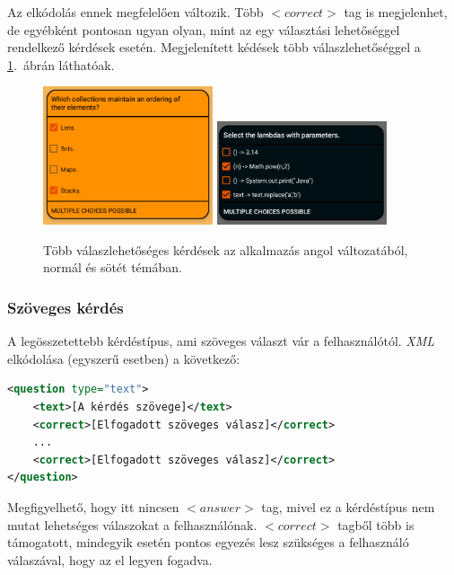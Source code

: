 \documentclass[12pt,a4paper]{article}
\newcommand{\xml}{\textit{XML}\xspace}
\begin{document}
	Az elkódolás ennek megfelelően változik. Több $<correct>$ tag is megjelenhet, de egyébként pontosan ugyan olyan, mint az egy választási lehetőséggel rendelkező kérdések esetén. Megjelenített kédések több válaszlehetőséggel a \ref{question_multi_choice_figure}.\ ábrán láthatóak.
	
	\begin{figure}[h!]
		\centering
		\includegraphics[width=5cm]{question_multi_choice}
		\includegraphics[width=5cm]{question_multi_choice_dark}
		\caption{Több válaszlehetőséges kérdések az alkalmazás angol változatából, normál és sötét témában.}
		\label{question_multi_choice_figure}
	\end{figure}
	
	\subsubsection{Szöveges kérdés}\label{question_text}
	
	A legösszetettebb kérdéstípus, ami szöveges választ vár a felhasználótól. \xml elkódolása (egyszerű esetben) a következő:
	
	\bigskip
	\begin{lstlisting}[language=XML]
<question type="text">
	<text>[A kérdés szövege]</text>
	<correct>[Elfogadott szöveges válasz]</correct>
	...
	<correct>[Elfogadott szöveges válasz]</correct>
</question>
	\end{lstlisting}
	\bigskip
	
	\noindent
	Megfigyelhető, hogy itt nincsen $<answer>$ tag, mivel ez a kérdéstípus nem mutat lehetséges válaszokat a felhasználónak. $<correct>$ tagből több is támogatott, mindegyik esetén pontos egyezés lesz szükséges a felhasználó válaszával, hogy az el legyen fogadva.
	
\end{document}
